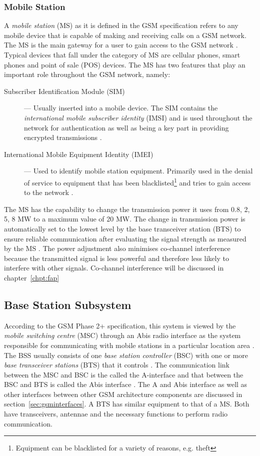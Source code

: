 \subsubsection{Mobile Station}
A \emph{mobile station} (MS) as it is defined in the GSM specification refers to any mobile device that is capable of making and receiving calls on a GSM network.  The MS is the main gateway 
for a user to gain access to the GSM network \cite{Eisenblatter,GSMArchitectureProtocolsServices}. Typical devices that fall under the category of MS are cellular phones, smart phones and point of sale (POS) devices. The MS has two features that play an important role throughout the GSM network, namely:
\begin{description}
\item[Subscriber Identification Module (SIM)] --- Usually inserted into a mobile device. The SIM contains the \emph{international mobile subscriber identity} (IMSI) and is used throughout the network for authentication as well as being a key part in providing encrypted transmissions \cite{Eisenblatter}.
\item[International Mobile Equipment Identity (IMEI)] --- Used to identify mobile station equipment. Primarily used in the denial of service to equipment that has been blacklisted\footnote{Equipment can be blacklisted for a variety of reasons, e.g. theft} and tries to gain access to the network \cite{Eisenblatter}.
\end{description}
The MS has the capability to change the transmission power it uses from 0.8, 2, 5, 8 MW to a maximum value of 20 MW\cite{GSMSysEngin}. The change in transmission power is automatically set to the lowest level by the base transceiver station (BTS) to ensure reliable communication after evaluating the signal strength as measured by the MS \cite{GSMSysEngin,GSMArchitectureProtocolsServices}. The power adjustment also minimises co-channel interference because the transmitted signal is less powerful and therefore less likely to interfere with other signals\cite{GSMSysEngin}. Co-channel interference will be discussed in chapter~\ref{chpt:fap}

\subsection{Base Station Subsystem}

According to the GSM Phase 2+ specification, this system is viewed by the \emph{mobile switching centre} (MSC) through an Abis radio interface as the system responsible for communicating with mobile stations in a particular location area \cite{Eisenblatter}. The BSS usually consists of one \emph{base station controller} (BSC) with one or more \emph{base transceiver stations} (BTS) that it controls \cite{Eisenblatter}. The communication link between the MSC and BSC is the called the A-interface and that between the BSC and BTS is called the Abis interface \cite{Eisenblatter}. The A and Abis interface as well as other interfaces between other GSM architecture components are discussed in section~\ref{sec:gsminterfaces}. A BTS has similar equipment to that of a MS\cite{GSMSysEngin}. Both have transceivers, antennae and the necessary functions to perform radio communication. 


